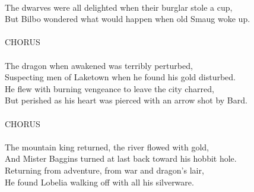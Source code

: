 \begin{multicols}{2}
\\
The dwarves were all delighted when their burglar stole a cup,
\\
But Bilbo wondered what would happen when old Smaug woke up.
\\
\\
CHORUS
\\
\\
The dragon when awakened was terribly perturbed,
\\
Suspecting men of Laketown when he found his gold disturbed.
\\
He flew with burning vengeance to leave the city charred,
\\
But perished as his heart was pierced with an arrow shot by Bard.
\\
\\
CHORUS
\\
\\
The mountain king returned, the river flowed with gold,
\\
And Mister Baggins turned at last back toward his hobbit hole.
\\
Returning from adventure, from war and dragon’s lair,
\\
He found Lobelia walking off with all his silverware.
\\
\\
\\
\\
\\
\\
\\
\end{multicols}
